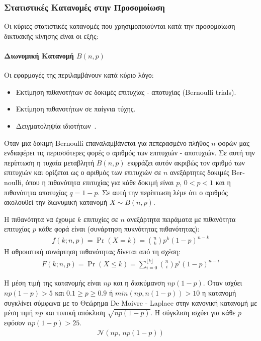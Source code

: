 \documentclass[12pt]{report}
\begin{document}
\subsubsection{Στατιστικές Κατανομές στην Προσομοίωση}
Οι κύριες στατιστικές κατανομές που χρησιμοποιούνται κατά την προσομοίωση δικτυακής κίνησης είναι οι εξής:
\paragraph{Διωνυμική Κατανομή \(B(n, p)\)} Οι εφαρμογές της περιλαμβάνουν κατά κύριο λόγο:
\begin{itemize}
  \item Εκτίμηση πιθανοτήτων σε δοκιμές επιτυχίας - αποτυχίας (\textlatin{Bernoulli trials}).
  \item Εκτίμηση πιθανοτήτων σε παίγνια τύχης.
  \item Δειγματοληψία ιδιοτήτων~\cite{book:07}.
\end{itemize}
Όταν μια δοκιμή \textlatin{Bernoulli} επαναλαμβάνεται για πεπερασμένο πλήθος \(n\) φορών μας ενδιαφέρει τις περισσότερες φορές ο αριθμός των επιτυχιών - αποτυχιών. Σε αυτή την περίπτωση η τυχαία μεταβλητή \(B(n, p)\) εκφράζει αυτόν ακριβώς τον αριθμό των επιτυχιών και ορίζεται ως ο αριθμός των επιτυχιών σε \(n\) ανεξάρτητες δοκιμές \textlatin{Bernoulli}, όπου η πιθανότητα επιτυχίας για κάθε δοκιμή είναι \(p\), \(0<p<1\) και η πιθανότητα αποτυχίας \(q=1-p\). Σε αυτή την περίπτωση λέμε ότι ο αριθμός ακολουθεί την διωνυμική κατανομή \(X \sim B(n, p)\).

Η πιθανότητα να έχουμε \(k\) επιτυχίες σε \(n\) ανεξάρτητα πειράματα με πιθανότητα επιτυχίας \(p\) κάθε φορά είναι (συνάρτηση πυκνότητας πιθανότητας):
\begin{align*}
f(k;n,p)=\Pr(X=k)={\binom {n}{k}}p^{k}(1-p)^{n-k}
\end{align*}
Η αθροιστική συνάρτηση πιθανότητας δίνεται από τη σχέση:
\begin{align*}
F(k;n,p)=\Pr(X \leq k)=\sum _{i=0}^{\lfloor k\rfloor }\binom {n}{i}p^{i}(1-p)^{n-i}
\end{align*}

Η μέση τιμή της κατανομής είναι \(np\) και η διακύμανση \(np(1-p)\). Όταν ισχύει \(np(1-p)>5\) και \(0.1 \geq p \geq 0.9\) ή \(min(np,n(1-p))>10\) η κατανομή συγκλίνει σύμφωνα με το Θεώρημα \textlatin{De Moivre - Laplace} στην κανονική κατανομή με μέση τιμή \(np\) και τυπική απόκλιση \(\sqrt{np(1-p)}\). Η σύγκλιση ισχύει για κάθε \(p\) εφόσον \(np(1-p)>25\).
\begin{align*}
\mathcal {N}(np,\,np(1-p))
\end{align*}
\end{document}
